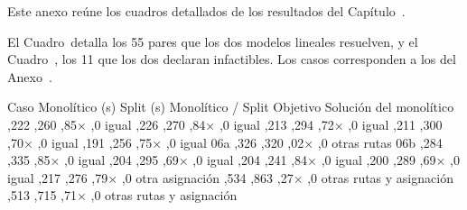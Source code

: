 \startchapter[title={Resultados detallados}, reference=Anexo_Resultados]

Este anexo reúne los cuadros detallados de los resultados del
Capítulo~\in[Capitulo_6].

\startsection[title={Monolítico contra Split en las pruebas funcionales}]

El Cuadro~ detalla los 55 pares que los dos modelos
lineales resuelven, y el Cuadro~, los 11 que los dos
declaran infactibles. Los casos corresponden a los del
Anexo~.

\startplacetable[reference=tab:res_pares, location={here,split}, title={Pares resueltos por los dos modelos lineales: tiempo total, objetivo y diferencias en la solución del monolítico.}]
	\bTABLE[split=yes, align=middle, frame=on, width=fit]
	\setupTABLE[row][1][background=color, backgroundcolor=darkgray, style=bold]
	\setupTABLE[column][2,3,4,5][align=flushright]
	\bTABLEhead
	\bTR \bTH Caso \eTH \bTH Monolítico (s) \eTH \bTH Split (s) \eTH \bTH Monolítico / Split \eTH \bTH Objetivo \eTH \bTH Solución del monolítico \eTH \eTR
	\eTABLEhead
	\bTABLEbody
	\bTR {} \eTD {},222 \eTD {},260 \eTD {},85× \eTD {},0 \eTD \bTD igual \eTD \eTR
	\bTR {} \eTD {},226 \eTD {},270 \eTD {},84× \eTD {},0 \eTD \bTD igual \eTD \eTR
	\bTR {} \eTD {},213 \eTD {},294 \eTD {},72× \eTD {},0 \eTD \bTD igual \eTD \eTR
	\bTR {} \eTD {},211 \eTD {},300 \eTD {},70× \eTD {},0 \eTD \bTD igual \eTD \eTR
	\bTR {} \eTD {},191 \eTD {},256 \eTD {},75× \eTD {},0 \eTD \bTD igual \eTD \eTR
	\bTR \bTD 06a \eTD {},326 \eTD {},320 \eTD {},02× \eTD {},0 \eTD \bTD otras rutas \eTD \eTR
	\bTR \bTD 06b \eTD {},284 \eTD {},335 \eTD {},85× \eTD {},0 \eTD \bTD igual \eTD \eTR
	\bTR {} \eTD {},204 \eTD {},295 \eTD {},69× \eTD {},0 \eTD \bTD igual \eTD \eTR
	\bTR {} \eTD {},204 \eTD {},241 \eTD {},84× \eTD {},0 \eTD \bTD igual \eTD \eTR
	\bTR {} \eTD {},200 \eTD {},289 \eTD {},69× \eTD {},0 \eTD \bTD igual \eTD \eTR
	\bTR {} \eTD {},217 \eTD {},276 \eTD {},79× \eTD {},0 \eTD \bTD otra asignación \eTD \eTR
	\bTR {} \eTD {},534 \eTD {},863 \eTD {},27× \eTD {},0 \eTD \bTD otras rutas y asignación \eTD \eTR
	\bTR {} \eTD {},513 \eTD {},715 \eTD {},71× \eTD {},0 \eTD \bTD otras rutas y asignación \eTD \eTR
